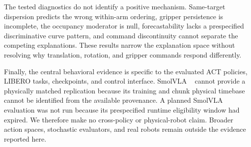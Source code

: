 The tested diagnostics do not identify a positive mechanism. Same-target
dispersion predicts the wrong within-arm ordering, gripper persistence is
incomplete, the occupancy moderator is null, forecastability lacks a
prespecified discriminative curve pattern, and command discontinuity cannot
separate the competing explanations. These results narrow the explanation
space without resolving why translation, rotation, and gripper commands respond
differently.

Finally, the central behavioral evidence is specific to the evaluated ACT
policies, LIBERO tasks, checkpoints, and control interface. SmolVLA
~\cite{shukor2025smolvla} cannot
provide a physically matched replication because its training and chunk
physical timebase cannot be identified from the available provenance. A
planned SmolVLA evaluation was not run because its prespecified runtime
eligibility window had expired. We therefore make no cross-policy or
physical-robot claim. Broader action spaces, stochastic evaluators, and real
robots remain outside the evidence reported here.

